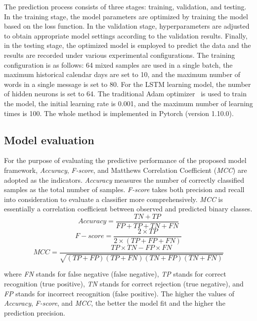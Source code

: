 \documentclass[sn-mathphys]{sn-jnl}%
\theoremstyle{thmstyleone}%
\theoremstyle{thmstyletwo}%
\theoremstyle{thmstylethree}%
\begin{document}
The prediction process consists of three stages: training, validation, and testing. In the training stage, the model parameters are optimized by training the model based on the loss function. In the validation stage, hyperparameters are adjusted to obtain appropriate model settings according to the validation results. Finally, in the testing stage, the optimized model is employed to predict the data and the results are recorded under various experimental configurations. The training configuration is as follows: 64 mixed samples are used in a single batch, the maximum historical calendar days are set to 10, and the maximum number of words in a single message is set to 80. For the LSTM learning model, the number of hidden neurons is set to 64. The traditional Adam optimizer~\cite{RN191} is used to train the model, the initial learning rate is 0.001, and the maximum number of learning times is 100. The whole method is implemented in Pytorch (version 1.10.0).

\subsection{Model evaluation}\label{Model evaluation}
For the purpose of evaluating the predictive performance of the proposed model framework, \emph{Accuracy}, \emph{F-score}, and Matthews Correlation Coefficient (\emph{MCC}) are adopted as the indicators. \emph{Accuracy} measures the number of correctly classified samples as the total number of samples. \emph{F-score} takes both precision and recall into consideration to evaluate a classifier more comprehensively. \emph{MCC} is essentially a correlation coefficient between observed and predicted binary classes.
\begin{equation}
Accuracy=\frac{T N+T P}{{F P}+{T P}+{T N}+{F N}} \label{eq16}
\end{equation}
\begin{equation}
F-score=\frac{2 \times T P}{2 \times({T P}+{F P}+{F N})} \label{eq17}
\end{equation}
\begin{equation}
M C C=\frac{T P \times T N-F P \times F N}{\sqrt{(T P+F P)(T P+F N)(T N+F P)(T N+F N)}} \label{eq18}
\end{equation}

where \emph{FN} stands for false negative (false negative), \emph{TP} stands for correct recognition (true positive), \emph{TN} stands for correct rejection (true negative), and \emph{FP} stands for incorrect recognition (false positive). The higher the values of \emph{Accuracy}, \emph{F-score}, and \emph{MCC}, the better the model fit and the higher the prediction precision.
\end{document}
